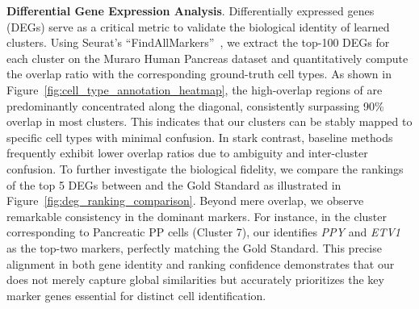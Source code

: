 \smallskip\noindent\textbf{Differential Gene Expression Analysis}. 
Differentially expressed genes (DEGs) serve as a critical metric to validate the biological identity of learned clusters. Using Seurat's ``FindAllMarkers''~\cite{butler2018integrating}, we extract the top-100 DEGs for each cluster on the Muraro Human Pancreas dataset and quantitatively compute the overlap ratio with the corresponding ground-truth cell types. As shown in Figure~\ref{fig:cell_type_annotation_heatmap}, the high-overlap regions of \method{} are predominantly concentrated along the diagonal, consistently surpassing 90\% overlap in most clusters. This indicates that our clusters can be stably mapped to specific cell types with minimal confusion. In stark contrast, baseline methods frequently exhibit lower overlap ratios due to ambiguity and inter-cluster confusion. To further investigate the biological fidelity, we compare the rankings of the top 5 DEGs between \method{} and the Gold Standard as illustrated in Figure~\ref{fig:deg_ranking_comparison}. Beyond mere overlap, we observe remarkable consistency in the dominant markers. For instance, in the cluster corresponding to Pancreatic PP cells (Cluster 7), our \method{} identifies \textit{PPY} and \textit{ETV1} as the top-two markers, perfectly matching the Gold Standard. This precise alignment in both gene identity and ranking confidence demonstrates that our \method{} does not merely capture global similarities but accurately prioritizes the key marker genes essential for distinct cell identification.
% 

